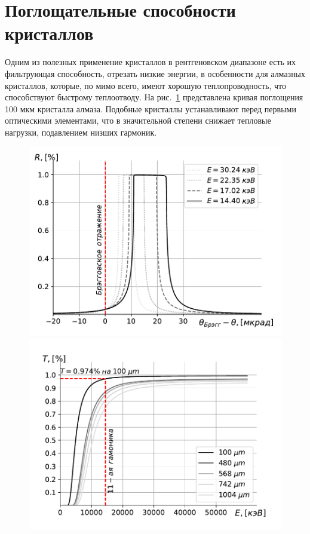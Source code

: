 \section{Поглощательные способности кристаллов}
Одним из полезных применение кристаллов в рентгеновском диапазоне есть их фильтрующая способность, отрезать низкие энергии, в особенности для алмазных кристаллов, которые, по мимо всего, имеют хорошую теплопроводность, что способствуют быстрому теплоотводу. На рис.~\ref{fig:bragg_T} представлена кривая поглощения 100 мкм кристалла алмаза. Подобные кристаллы устанавливают перед первыми оптическими элементами, что в значительной степени снижает тепловые нагрузки, подавлением низших гармоник.
\begin{figure}
	\centering  
	\begin{minipage}{0.49\textwidth}
		\centering
		\includegraphics[width=\textwidth]{pic/bragg_R.pdf}
		\caption{}
		\label{fig:bragg_R}
	\end{minipage}\hfill
	\begin{minipage}{0.49\textwidth}
		\centering
		\includegraphics[width=\textwidth]{pic/bragg_T.pdf}
		\caption{}
		\label{fig:bragg_T}
	\end{minipage}    
\end{figure}
